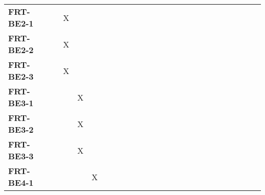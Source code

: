 \documentclass[12pt, titlepage]{article}
\begin{document}
\begin{landscape}
\begin{longtable}{|l|ccccccccccccccccc|}
		\textbf{FRT-BE2-1}  & ~                                                         & X            & ~            & ~            & ~            & ~            & ~            & ~            & ~            & ~             & ~             & ~             & ~             & ~             & ~             & ~             & ~             \\
		\textbf{FRT-BE2-2}  & ~                                                         & X            & ~            & ~            & ~            & ~            & ~            & ~            & ~            & ~             & ~             & ~             & ~             & ~             & ~             & ~             & ~             \\
		\textbf{FRT-BE2-3}  & ~                                                         & X            & ~            & ~            & ~            & ~            & ~            & ~            & ~            & ~             & ~             & ~             & ~             & ~             & ~             & ~             & ~             \\
		\textbf{FRT-BE3-1}  & ~                                                         & ~            & X            & ~            & ~            & ~            & ~            & ~            & ~            & ~             & ~             & ~             & ~             & ~             & ~             & ~             & ~             \\
		\textbf{FRT-BE3-2}  & ~                                                         & ~            & X            & ~            & ~            & ~            & ~            & ~            & ~            & ~             & ~             & ~             & ~             & ~             & ~             & ~             & ~             \\
		\textbf{FRT-BE3-3}  & ~                                                         & ~            & X            & ~            & ~            & ~            & ~            & ~            & ~            & ~             & ~             & ~             & ~             & ~             & ~             & ~             & ~             \\
		\textbf{FRT-BE4-1}  & ~                                                         & ~            & ~            & X            & ~            & ~            & ~            & ~            & ~            & ~             & ~             & ~             & ~             & ~             & ~             & ~             & ~             \\

\end{longtable}
\end{landscape}
\end{document}
